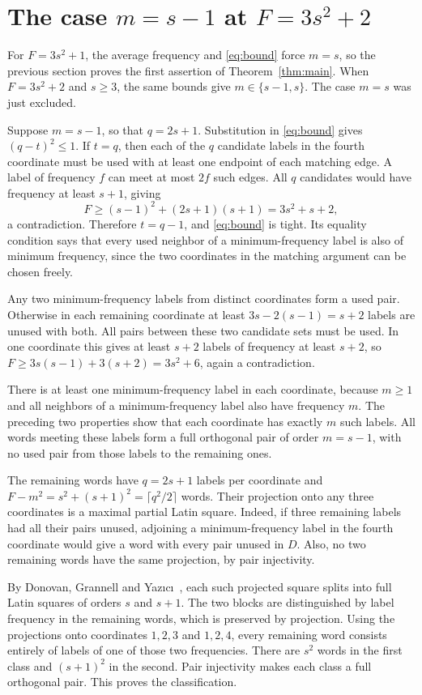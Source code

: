 \documentclass[11pt]{article}
\begin{document}
\section[Minimum frequency s minus 1]{The case \(m=s-1\) at \(F=3s^2+2\)}

For \(F=3s^2+1\), the average frequency and \eqref{eq:bound}
force \(m=s\), so the previous section proves the first assertion
of Theorem~\ref{thm:main}. When \(F=3s^2+2\) and \(s\ge3\), the
same bounds give \(m\in\{s-1,s\}\). The case \(m=s\) was just excluded.

Suppose \(m=s-1\), so that \(q=2s+1\). Substitution in
\eqref{eq:bound} gives \((q-t)^2\le1\). If \(t=q\), then each of
the \(q\) candidate labels in the fourth coordinate must be used
with at least one endpoint of each matching edge. A label of
frequency \(f\) can meet at most \(2f\) such edges. All \(q\)
candidates would have frequency at least \(s+1\), giving
\[
F\ge (s-1)^2+(2s+1)(s+1)=3s^2+s+2,
\]
a contradiction. Therefore \(t=q-1\), and \eqref{eq:bound} is
tight. Its equality condition says that every used neighbor of a
minimum-frequency label is also of minimum frequency, since the
two coordinates in the matching argument can be chosen freely.

Any two minimum-frequency labels from distinct coordinates form a
used pair. Otherwise in each remaining coordinate at least
\(3s-2(s-1)=s+2\) labels are unused with both. All pairs between
these two candidate sets must be used. In one coordinate this gives
at least \(s+2\) labels of frequency at least \(s+2\), so
\(F\ge 3s(s-1)+3(s+2)=3s^2+6\), again a contradiction.

There is at least one minimum-frequency label in each coordinate,
because \(m\ge1\) and all neighbors of a minimum-frequency label
also have frequency \(m\). The preceding two properties show that
each coordinate has exactly \(m\) such labels. All words meeting
these labels form a full orthogonal pair of order \(m=s-1\), with
no used pair from those labels to the remaining ones.

The remaining words have \(q=2s+1\) labels per coordinate and
\(F-m^2=s^2+(s+1)^2=\lceil q^2/2\rceil\) words. Their projection onto
any three coordinates is a maximal partial Latin square. Indeed,
if three remaining labels had all their pairs unused, adjoining
a minimum-frequency label in the fourth coordinate would give a
word with every pair unused in \(D\). Also, no two remaining words
have the same projection, by pair injectivity.

By Donovan, Grannell and Yaz\i c\i~\cite[Lemma 1.1]{feb}, each
such projected square splits into full Latin squares of orders \(s\)
and \(s+1\). The two blocks are distinguished by label frequency in
the remaining words, which is preserved by projection. Using the
projections onto coordinates \(1,2,3\) and \(1,2,4\), every remaining
word consists entirely of labels of one of those two frequencies.
There are \(s^2\) words in the first class and \((s+1)^2\) in the
second. Pair injectivity makes each class a full orthogonal pair.
This proves the classification.
\end{document}
